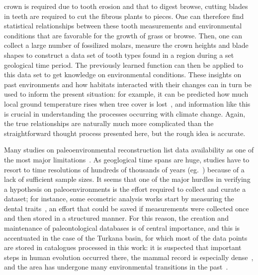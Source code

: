 \documentclass[english,twoside,openright]{UH_DS_MSc}
\begin{document}
crown is required due to tooth erosion and that to digest browse, cutting blades in teeth are required to cut the fibrous plants to pieces.
One can therefore find statistical relationships between these tooth measurements and environmental conditions that are favorable 
for the growth of grass or browse. Then, one can collect a large number of fossilized molars, measure the crown heights and blade shapes to construct a data set of 
tooth types found in a region during a set geological time period. The previously learned function can then be applied to this data set
 to get knowledge on environmental conditions. These insights on 
 past environments and how habitats interacted with their changes can 
 in turn be used to inform the present situation: for example, it can 
 be predicted how much local ground temperature rises when tree cover is lost~\cite{fortelius},
 and information like this is crucial in understanding the processes occurring with climate change.
  Again, the true relationships are naturally much more complicated 
 than the straightforward thought process presented here, but the rough idea is accurate.




Many studies on paleoenvironmental reconstruction list data availability as one of the most major limitations~\cite{oksanenHumboldtianApproachLife2019 fortelius}.
As geoglogical time spans are huge, studies have to 
resort to time resolutions of hundreds of thousands of years (eg.~\cite{fortelius}) because of a lack 
of sufficient sample sizes. It seems that one of the major hurdles in verifying a hypothesis on 
paleoenvironments is the effort required to collect and curate a dataset; for instance, some ecometric
analysis works start by measuring the dental traits~\cite{fortelius}, an effort that could be saved 
if measurements were collected once and then stored in a structured manner. For this reason, the 
creation and maintenance of paleontological databases is of central importance, and this is accentuated 
in the case of the Turkana basin, for which most of the data points are stored in catalogues processed in 
this work: it is suspected that
important steps in human evolution occurred there, the mammal record is especially dense~\cite{fortelius}, and the area has undergone many environmental transitions in the past~\cite{Zliobaite2023}.
\end{document}
